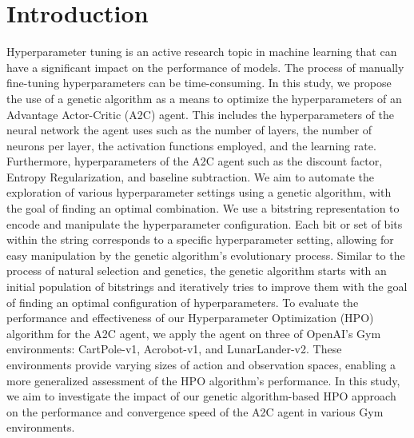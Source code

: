 \documentclass{article}
\begin{document}

\printAffiliationsAndNotice{}

\section{Introduction}
\label{sec:intro}
Hyperparameter tuning is an active research topic in machine learning that can have a significant impact on the performance of models. 
The process of manually fine-tuning hyperparameters can be time-consuming. 
In this study, we propose the use of a genetic algorithm as a means to optimize the hyperparameters of an Advantage Actor-Critic (A2C) agent. 
This includes the hyperparameters of the neural network the agent uses such as the number of layers, the number of neurons per layer, the activation functions employed, and the learning rate. Furthermore, hyperparameters of the A2C agent such as the discount factor, Entropy Regularization, and baseline subtraction. 
We aim to automate the exploration of various hyperparameter settings using a genetic algorithm, with the goal of finding an optimal combination. 
We use a bitstring representation to encode and manipulate the hyperparameter configuration. 
Each bit or set of bits within the string corresponds to a specific hyperparameter setting, allowing for easy manipulation by the genetic algorithm's evolutionary process. 
Similar to the process of natural selection and genetics, the genetic algorithm starts with an initial population of bitstrings and iteratively tries to improve them with the goal of finding an optimal configuration of hyperparameters. 
To evaluate the performance and effectiveness of our Hyperparameter Optimization (HPO) algorithm for the A2C agent, we apply the agent on three of OpenAI's Gym environments: CartPole-v1, Acrobot-v1, and LunarLander-v2. 
These environments provide varying sizes of action and observation spaces, enabling a more generalized assessment of the HPO algorithm's performance.
In this study, we aim to investigate the impact of our genetic algorithm-based HPO approach on the performance and convergence speed of the A2C agent in various Gym environments. 
\end{document}
